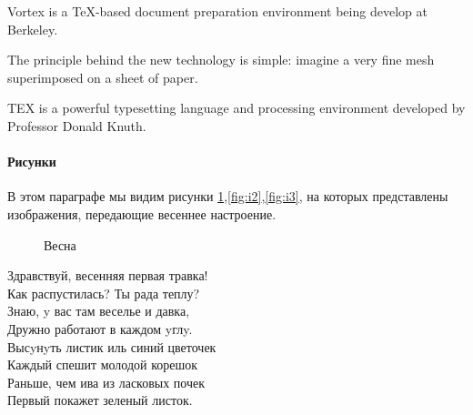 \documentclass[a4paper,12pt]{article}         %
\begin{document}
Vortex is a TeX-based document preparation environment being develop at Berkeley\cite{desarmenien1986tex}.

The principle behind the new technology is simple: imagine a very fine mesh superimposed on a sheet of paper\cite{levy2012beginner}.

TEX is a powerful typesetting language and processing environment developed by Professor Donald Knuth\cite{vulis1992modern}.





\newpage
\paragraph{Рисунки} В этом параграфе мы видим рисунки \ref{fig:i1},\ref{fig:i2},\ref{fig:i3}, на которых представлены изображения, передающие весеннее настроение.
\begin{figure}[h]
	\caption{Весна}
	\label{fig:i1}
\end{figure}
\begin{center}
Здравствуй, весенняя первая травка!
\\Как распустилась? Ты рада теплу?
\\Знаю, y вас там веселье и давка,
\\Дружно работают в каждом yглy.
\\Высyнyть листик иль синий цветочек
\\Каждый спешит молодой корешок
\\Раньше, чем ива из ласковых почек
\\Первый покажет зеленый листок.
\end{center}
\end{document}

